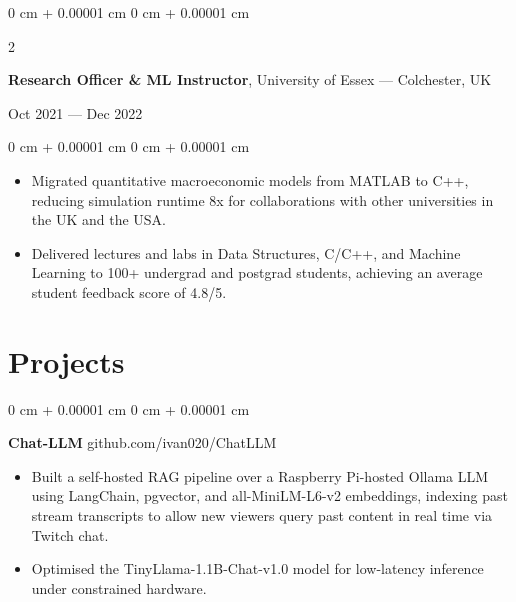 \documentclass[6pt, letterpaper]{article}
\newenvironment{highlights}{
    \begin{itemize}[
        topsep=0.03 cm,
        parsep=0.03 cm,
        partopsep=0pt,
        itemsep=0pt,
        leftmargin=0 cm + 10pt
    ]
}{
    \end{itemize}
} %
\newenvironment{onecolentry}{
    \begin{adjustwidth}{
        0 cm + 0.00001 cm
    }{
        0 cm + 0.00001 cm
    }
}{
    \end{adjustwidth}
} %
\newenvironment{twocolentry}[2][]{
    \onecolentry
    \def\secondColumn{#2}
    \setcolumnwidth{\fill, 4.5 cm}
    \begin{paracol}{2}
}{
    \switchcolumn \raggedleft \secondColumn
    \end{paracol}
    \endonecolentry
} %
\begin{document}
        \begin{twocolentry}{Oct 2021 --- Dec 2022}
        \textbf{Research Officer \& ML Instructor}, University of Essex --- Colchester, UK
        \end{twocolentry}

        \begin{onecolentry}
        \begin{highlights}
        \item Migrated quantitative macroeconomic models from MATLAB to C++, reducing simulation runtime 8x for collaborations with other universities in the UK and the USA.
        \item Delivered lectures and labs in Data Structures, C/C++, and Machine Learning to 100+ undergrad and postgrad students, achieving an average student feedback score of 4.8/5.
        \end{highlights}
        \end{onecolentry}


    \section{Projects}

    \begin{onecolentry}
        \textbf{Chat-LLM} \hfill github.com/ivan020/ChatLLM

        \begin{highlights}

            \item Built a self-hosted RAG pipeline over a Raspberry Pi-hosted Ollama LLM using LangChain, pgvector, and all-MiniLM-L6-v2 embeddings, indexing past stream transcripts to allow new viewers query past content in real time via Twitch chat.
            \item Optimised the TinyLlama-1.1B-Chat-v1.0 model for low-latency inference under constrained hardware.

        \end{highlights}
    \end{onecolentry}
\end{document}
